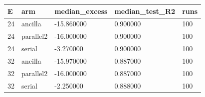 \begin{tabular}{lllll}
\toprule
E & arm & median_excess & median_test_R2 & runs \\
\midrule
24 & ancilla & -15.860000 & 0.900000 & 100 \\
24 & parallel2 & -16.000000 & 0.900000 & 100 \\
24 & serial & -3.270000 & 0.900000 & 100 \\
32 & ancilla & -15.970000 & 0.887000 & 100 \\
32 & parallel2 & -16.000000 & 0.887000 & 100 \\
32 & serial & -2.250000 & 0.888000 & 100 \\
\bottomrule
\end{tabular}
